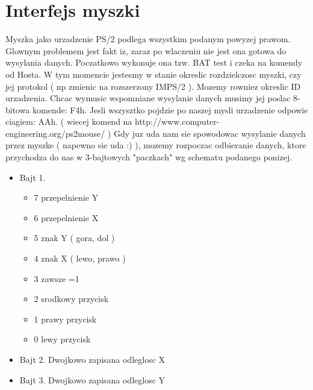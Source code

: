 \documentclass{article}
\begin{document}
	\section{Interfejs myszki}
		Myszka jako urzadzenie PS/2 podlega wszystkim podanym powyzej prawom. Glownym problemem jest fakt iz, zaraz po wlaczeniu nie jest ona gotowa do wysylania danych. Poczatkowo wykonuje ona tzw. BAT test i czeka na komendy od Hosta. W tym momencie jestesmy w stanie okreslic rozdzielczosc myszki, czy jej protokol ( np zmienic na rozszerzony IMPS/2 ). Mozemy rowniez okreslic ID urzadzenia. Chcac wymusic wspomniane wysylanie danych musimy jej poslac 8-bitowa komende: F4h. Jesli wszysztko pojdzie po naszej mysli urzadzenie odpowie ciagiem: AAh. ( wiecej komend na http://www.computer-engineering.org/ps2mouse/ ) 
		Gdy juz uda nam sie spowodowac wysylanie danych przez myszke ( napewno sie uda :) ), mozemy rozpoczac odbieranie danych, ktore przychodza do nas w 3-bajtowych "paczkach" wg schematu podanego ponizej.\begin{itemize}
		\item{Bajt 1.}
			\begin{itemize}
			\item{7} przepelnienie Y
			\item{6} przepelnienie X
			\item{5} znak Y ( gora, dol )
			\item{4} znak X ( lewo, prawo )
			\item{3} zawsze =1
			\item{2} srodkowy przycisk
			\item{1} prawy przycisk
			\item{0} lewy przycisk
			\end{itemize}
		\item{Bajt 2.}
			Dwojkowo zapisana odleglosc X
		\item{Bajt 3.}
			Dwojkowo zapisana odleglosc Y
		\end{itemize}
\end{document}
